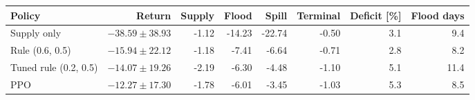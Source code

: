 \begin{tabular}{lrrrrrrr}
\toprule
Policy & Return & Supply & Flood & Spill & Terminal & Deficit [\%] & Flood days \\
\midrule
Supply only & $-38.59\pm38.93$ & -1.12 & -14.23 & -22.74 & -0.50 & 3.1 & 9.4 \\
Rule (0.6, 0.5) & $-15.94\pm22.12$ & -1.18 & -7.41 & -6.64 & -0.71 & 2.8 & 8.2 \\
Tuned rule (0.2, 0.5) & $-14.07\pm19.26$ & -2.19 & -6.30 & -4.48 & -1.10 & 5.1 & 11.4 \\
PPO & $-12.27\pm17.30$ & -1.78 & -6.01 & -3.45 & -1.03 & 5.3 & 8.5 \\
\bottomrule
\end{tabular}
